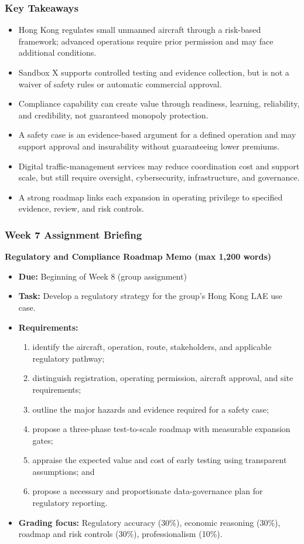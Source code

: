 \documentclass{beamer}
\begin{document}
\begin{frame}[t]
\frametitle{Key Takeaways}
\begin{itemize}
\item Hong Kong regulates small unmanned aircraft through a risk-based framework; advanced operations require prior permission and may face additional conditions.
\item Sandbox X supports controlled testing and evidence collection, but is not a waiver of safety rules or automatic commercial approval.
\item Compliance capability can create value through readiness, learning, reliability, and credibility, not guaranteed monopoly protection.
\item A safety case is an evidence-based argument for a defined operation and may support approval and insurability without guaranteeing lower premiums.
\item Digital traffic-management services may reduce coordination cost and support scale, but still require oversight, cybersecurity, infrastructure, and governance.
\item A strong roadmap links each expansion in operating privilege to specified evidence, review, and risk controls.
\end{itemize}
\end{frame}

\begin{frame}[t]
\frametitle{Week 7 Assignment Briefing}
\textbf{Regulatory and Compliance Roadmap Memo (max 1,200 words)}
\begin{itemize}
\item \textbf{Due:} Beginning of Week 8 (group assignment)
\item \textbf{Task:} Develop a regulatory strategy for the group's Hong Kong LAE use case.
\item \textbf{Requirements:}
\begin{enumerate}
\item identify the aircraft, operation, route, stakeholders, and applicable regulatory pathway;
\item distinguish registration, operating permission, aircraft approval, and site requirements;
\item outline the major hazards and evidence required for a safety case;
\item propose a three-phase test-to-scale roadmap with measurable expansion gates;
\item appraise the expected value and cost of early testing using transparent assumptions; and
\item propose a necessary and proportionate data-governance plan for regulatory reporting.
\end{enumerate}
\item \textbf{Grading focus:} Regulatory accuracy (30\%), economic reasoning (30\%), roadmap and risk controls (30\%), professionalism (10\%).
\end{itemize}
\end{frame}
\end{document}
